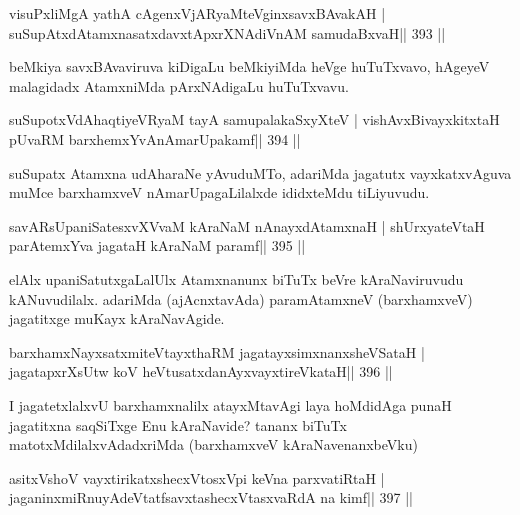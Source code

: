 \begin{shl}
visuPxliMgA yathA cAgenxVjARyaMteV\s ginxsavxBAvakAH |
suSupAtxdAtamxnasatxdavxtApxrXNAdiVnAM samudaBxvaH\hfill || 393 ||
\end{shl}

\begin{artha}
beMkiya savxBAvaviruva kiDigaLu beMkiyiMda heVge huTuTxvavo, hAgeyeV malagidadx AtamxniMda pArxNAdigaLu huTuTxvavu.
\end{artha}

\begin{shl}
suSupotxVdAhaqtiyeVRyaM tayA samupalakaSxyXteV |
vishAvxBivayxkitxtaH pUvaRM barxhemxYvAnAmarUpakamf\hfill || 394 ||
\end{shl}

\begin{artha}
suSupatx Atamxna udAharaNe yAvuduMTo, adariMda jagatutx vayxkatxvAguva muMce barxhamxveV nAmarUpagaLilalxde ididxteMdu tiLiyuvudu.
\end{artha}

\begin{shl}
savARsUpaniSatesxvXVvaM kAraNaM nAnayxdAtamxnaH |
shUrxyateV\s taH parAtemxYva jagataH kAraNaM paramf\hfill || 395 ||
\end{shl}

\begin{artha}
elAlx upaniSatutxgaLalUlx Atamxnanunx biTuTx beVre kAraNaviruvudu  kANuvudilalx. adariMda (ajAcnxtavAda) paramAtamxneV (barxhamxveV) jagatitxge muKayx kAraNavAgide.
\end{artha}


\begin{shl}
barxhamxNayxsatxmiteV\s tayxthaRM jagatayxsimxnanxsheVSataH |
jagatapxrXsUtw koV heVtusatxdanAyxvayxtireVkataH\hfill || 396 ||
\end{shl}

\begin{artha}
I jagatetxlalxvU barxhamxnalilx atayxMtavAgi laya hoMdidAga punaH 
jagatitxna saqSiTxge Enu kAraNavide? tananx biTuTx matotxMdilalxvAdadxriMda (barxhamxveV kAraNavenanxbeVku) 
\end{artha}


\begin{shl}
asitxVshoV vayxtirikatxshecxVtosxV\s pi keVna parxvatiRtaH |
jaganinxmiRnuyAdeVtatfsavxtashecxVtasxvaRdA na kimf\hfill || 397 ||
\end{shl}

